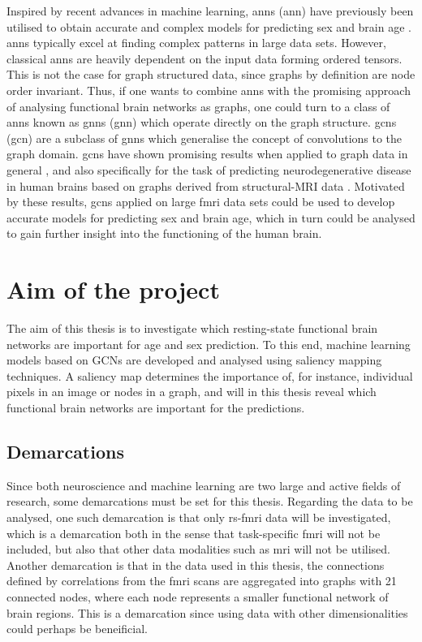 Inspired by recent advances in machine learning, \acrlong{ann}s (\acrshort{ann}) have previously been utilised to obtain accurate and complex models for predicting sex and brain age \cite{amoroso_multiplex_age, stankeviciute, arslan}. \acrshort{ann}s typically excel at finding complex patterns in large data sets. However, classical \acrshort{ann}s are heavily dependent on the input data forming ordered tensors. This is not the case for graph structured data, since graphs by definition are node order invariant. Thus, if one wants to combine \acrshort{ann}s with the promising approach of analysing functional brain networks as graphs, one could turn to a class of \acrshort{ann}s known as \acrlong{gnn}s (\acrshort{gnn}) which operate directly on the graph structure. \acrlong{gcn}s (\acrshort{gcn}) are a subclass of \acrshort{gnn}s which generalise the concept of convolutions to the graph domain. \acrshort{gcn}s have shown promising results when applied to graph data in general \cite{kipf_semi_supervised, kipf_vae, wu_review}, and also specifically for the task of predicting neurodegenerative disease in human brains based on graphs derived from structural-MRI data \cite{jansson_sandstrom}. Motivated by these results, \acrshort{gcn}s applied on large \acrshort{fmri} data sets could be used to develop accurate models for predicting sex and brain age, which in turn could be analysed to gain further insight into the functioning of the human brain.


\section{Aim of the project}
The aim of this thesis is to investigate which resting-state functional brain networks are important for age and sex prediction. To this end, machine learning models based on GCNs are developed and analysed using saliency mapping techniques. A saliency map determines the importance of, for instance, individual pixels in an image or nodes in a graph, and will in this thesis reveal which functional brain networks are important for the predictions. 

\subsection{Demarcations}
Since both neuroscience and machine learning are two large and active fields of research, some demarcations must be set for this thesis. Regarding the data to be analysed, one such demarcation is that only \acrshort{rs-fmri} data will be investigated, which is a demarcation both in the sense that task-specific \acrshort{fmri} will not be included, but also that other data modalities such as \acrshort{mri} will not be utilised. Another demarcation is that in the data used in this thesis, the connections defined by correlations from the \acrshort{fmri} scans are aggregated into graphs with 21 connected nodes, where each node represents a smaller functional network of brain regions. This is a demarcation since using data with other dimensionalities could perhaps be beneificial.

